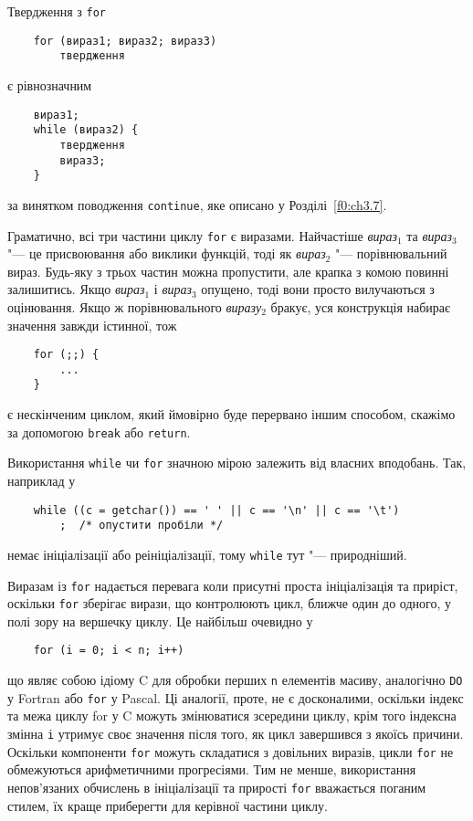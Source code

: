 \documentclass[a4paper,12pt]{book}
\begin{document}
  Твердження з \texttt{for}
  \begin{verbatim}
    for (вираз1; вираз2; вираз3)
        твердження
  \end{verbatim}
  є рівнозначним
  \begin{verbatim}
    вираз1;
    while (вираз2) {
        твердження
        вираз3;
    }
  \end{verbatim}
  за винятком поводження \texttt{continue}, яке описано у Розділі~\ref{f0:ch3.7}.

  Граматично, всі три частини циклу \texttt{for} є виразами. Найчастіше
  \textit{вираз\(_{1}\)} та \textit{вираз\(_{3}\)} "--- це присвоювання або виклики
  функцій, тоді як \textit{вираз\(_{2}\)} "--- порівнювальний вираз. Будь-яку з трьох
  частин можна пропустити, але крапка з комою повинні залишитись. Якщо
  \textit{вираз\(_{1}\)} і \textit{вираз\(_{3}\)} опущено, тоді вони просто
  вилучаються з оцінювання. Якщо ж порівнювального \textit{виразу\(_{2}\)} бракує, уся
  конструкція набирає значення завжди істинної, тож
  \begin{verbatim}
    for (;;) {
        ...
    }
  \end{verbatim}
  є нескінченим циклом, який ймовірно буде перервано іншим способом, скажімо за допомогою
  \texttt{break} або \texttt{return}.

  Використання \texttt{while} чи \texttt{for} значною мірою залежить від власних
  вподобань. Так, наприклад у
  \begin{verbatim}
    while ((c = getchar()) == ' ' || c == '\n' || c == '\t')
        ;  /* опустити пробіли */
  \end{verbatim}
  немає ініціалізації або реініціалізації, тому \texttt{while} тут "--- природніший.

  Виразам із \texttt{for} надається перевага коли присутні проста ініціалізація та
  приріст, оскільки \texttt{for} зберігає вирази, що контролюють цикл, ближче один до
  одного, у полі зору на вершечку циклу. Це найбільш очевидно у
  \begin{verbatim}
    for (i = 0; i < n; i++)
  \end{verbatim}
  що являє собою ідіому C для обробки перших \texttt{n} елементів масиву, аналогічно
  \texttt{DO} у Fortran або \texttt{for} у Pascal. Ці аналогії, проте, не є досконалими,
  оскільки індекс та межа циклу for у C можуть змінюватися зсередини циклу, крім того
  індексна змінна \texttt{i} утримує своє значення після того, як цикл завершився з якоїсь
  причини. Оскільки компоненти \texttt{for} можуть складатися з довільних виразів, цикли
  \texttt{for} не обмежуються арифметичними прогресіями. Тим не менше, використання
  непов'язаних обчислень в ініціалізації та прирості \texttt{for} вважається поганим
  стилем, їх краще приберегти для керівної частини циклу.
\end{document}

